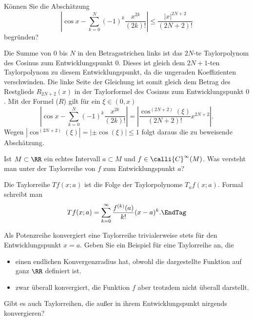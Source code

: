 \begin{frage}
  Können Sie die Abschätzung 
  \[
  \left| \cos x- \sum_{k=0}^N (-1)^k \frac{x^{2k}}{(2k)!} \right|
  \le \frac{|x|^{2N+2}}{(2N+2)!}
  \]
  begründen?
\end{frage}

\begin{antwort}
  Die Summe von $0$ bis $N$ in den Betragsstrichen 
  links ist das $2N$-te Taylorpolynom des Cosinus zum 
  Entwicklungspunkt $0$. Dieses ist gleich dem 
  $2N+1$-ten Taylorpolynom zu diesem Entwicklungspunkt, 
  da die ungeraden Koeffizienten verschwinden. 
  Die linke Seite der Gleichung ist somit 
  gleich dem Betrag des Restglieds $R_{2N+2}(x)$ 
  in der Taylorformel des Cosinus zum Entwicklungspunkt $0$. 
  Mit der Formel ($R$) gilt für ein $\xi \in (0,x)$ 
  \[
  \left| \cos x- \sum_{k=0}^N (-1)^k \frac{x^{2k}}{(2k)!} \right|
  = \left| \frac{\cos^{(2N+2)}( \xi )}{(2N+2)!} x^{2N+2} \right|.
  \]
  Wegen $|\cos^{(2N+2)}(\xi)|=|\pm\cos(\xi)|\le 1$ folgt daraus die 
  zu beweisende Abschätzung. \AntEnd 
\end{antwort}

\begin{frage}
  Ist $M\subset \RR$ ein echtes Intervall $a\subset M$ 
  und $f\in \calli{C}^\infty(M)$. Was versteht man unter 
  der Taylorreihe von $f$ zum Entwicklungspunkt $a$?
\end{frage}

\begin{antwort}
  Die Taylorreihe $Tf(x;a)$ 
  ist die Folge der Taylorpolynome 
  $T_n f(x;a)$. Formal schreibt man
  \begin{equation}
    Tf(x;a) = \sum_{k=0}^\infty \frac{f^{(k)}(a)}{k!} (x-a)^k.
    \EndTag
  \end{equation}  
\end{antwort}

\begin{frage}
  Als Potenzreihe konvergiert eine Taylorreihe trivialerweise 
  stets für den Entwicklungspunkt $x=a$. 
  Geben Sie ein Beispiel für eine Taylorreihe an, die 
  {\setlength{\labelsep}{4mm}
    \begin{itemize}
    \item[\desc{a}] 
      einen endlichen Konvergenzradius hat, obwohl die dargestellte 
      Funktion auf ganz $\RR$ definiert ist.
    \item[\desc{b}] 
      zwar überall konvergiert, 
      die Funktion $f$ aber trotzdem nicht überall darstellt. 
    \end{itemize}}
  Gibt es auch Taylorreihen, die außer in ihrem Entwicklungspunkt nirgends 
  konvergieren?
\end{frage}

